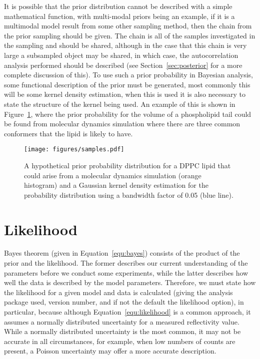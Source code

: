 \documentclass[reprint,superscriptaddress,aps,amsmath,linenumbers]{revtex4-2}
\begin{document}
It is possible that the prior distribution cannot be described with a simple mathematical function, with multi-modal priors being an example, if it is a multimodal model result from some other sampling method, then the chain from the prior sampling should be given. 
The chain is all of the samples investigated in the sampling and should be shared, although in the case that this chain is very large a subsampled object may be shared, in which case, the autocorrelation analysis performed should be described (see Section~\ref{sec:posterior} for a more complete discussion of this).
To use such a prior probability in Bayesian analysis, some functional description of the prior must be generated, most commonly this will be some kernel density estimation, when this is used it is also necessary to state the structure of the kernel being used. 
An example of this is shown in Figure~\ref{fig:samples}, where the prior probability for the volume of a phospholipid tail could be found from molecular dynamics simulation where there are three common conformers that the lipid is likely to have.
%
\begin{figure}
  \texttt{[image: figures/samples.pdf]}
  \caption{
    A hypothetical prior probability distribution for a DPPC lipid that could arise from a molecular dynamics simulation (orange histogram) and a Gaussian kernel density estimation for the probability distribution using a bandwidth factor of \num{0.05} (blue line). 
  }
  \label{fig:samples}
\end{figure}
%

\section{Likelihood}
\label{sec:likelihood}

Bayes theorem (given in Equation~\ref{equ:bayes}) consists of the product of the prior and the likelihood. 
The former describes our current understanding of the parameters before we conduct some experiments, while the latter describes how well the data is described by the model parameters. 
Therefore, we must state how the likelihood for a given model and data is calculated (giving the analysis package used, version number, and if not the default the likelihood option), in particular, because although Equation~\ref{equ:likelihood} is a common approach, it assumes a normally distributed uncertainty for a measured reflectivity value. 
While a normally distributed uncertainty is the most common, it may not be accurate in all circumstances, for example, when low numbers of counts are present, a Poisson uncertainty may offer a more accurate description. 
\end{document}
